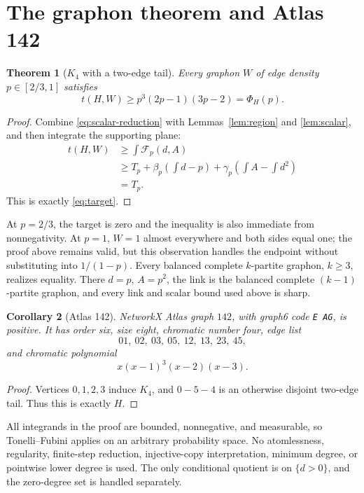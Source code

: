 \documentclass[11pt]{article}
\newtheorem{theorem}{Theorem}[section]
\newtheorem{corollary}[theorem]{Corollary}
\begin{document}
\section{The graphon theorem and Atlas 142}

\begin{theorem}[$K_4$ with a two-edge tail]\label{thm:main}
Every graphon $W$ of edge density $p\in[2/3,1]$ satisfies
\[
 \boxed{
 t(H,W)\geq p^3(2p-1)(3p-2)=\Phi_H(p).
 }
\]
\end{theorem}

\begin{proof}
Combine \eqref{eq:scalar-reduction} with Lemmas~\ref{lem:region} and
\ref{lem:scalar}, and then integrate the supporting plane:
\begin{align*}
 t(H,W)
 &\geq\int\mathcal F_p(d,A)\\
 &\geq T_p+\beta_p\left(\int d-p\right)
       +\gamma_p\left(\int A-\int d^2\right)\\
 &=T_p.
\end{align*}
This is exactly \eqref{eq:target}.
\end{proof}

At $p=2/3$, the target is zero and the inequality is also immediate from
nonnegativity.  At $p=1$, $W=1$ almost everywhere and both sides equal one;
the proof above remains valid, but this observation handles the endpoint
without substituting into $1/(1-p)$.  Every balanced complete $k$-partite
graphon, $k\geq3$, realizes equality.  There $d=p$, $A=p^2$, the link is the
balanced complete $(k-1)$-partite graphon, and every link and scalar bound
used above is sharp.

\begin{corollary}[Atlas 142]
NetworkX Atlas graph $142$, with graph6 code \texttt{E AG}, is
positive.  It has order six, size eight, chromatic number four, edge list
\[
 01,\ 02,\ 03,\ 05,\ 12,\ 13,\ 23,\ 45,
\]
and chromatic polynomial
\[
 x(x-1)^3(x-2)(x-3).
\]
\end{corollary}

\begin{proof}
Vertices $0,1,2,3$ induce $K_4$, and $0-5-4$ is an otherwise disjoint
two-edge tail.  Thus this is exactly $H$.
\end{proof}

All integrands in the proof are bounded, nonnegative, and measurable, so
Tonelli--Fubini applies on an arbitrary probability space.  No atomlessness,
regularity, finite-step reduction, injective-copy interpretation, minimum
degree, or pointwise lower degree is used.  The only conditional quotient is
on $\{d>0\}$, and the zero-degree set is handled separately.
\end{document}
